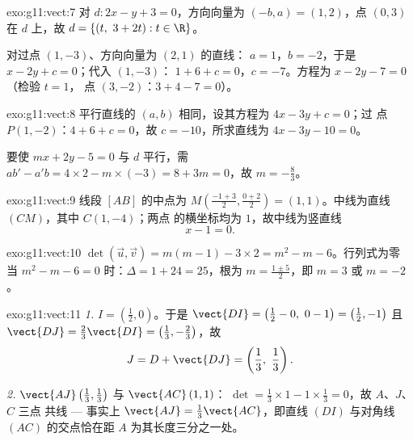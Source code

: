 \begin{solution}{exo:g11:vect:7}
对 $d: 2x - y + 3 = 0$，方向向量为 $(-b, a) = (1, 2)$，点
$(0, 3)$ 在 $d$ 上，故 $d = \{(t,\ 3 + 2t) : t \in \R\}$。

对过点 $(1, -3)$、方向向量为 $(2, 1)$ 的直线：
$a = 1$，$b = -2$，于是 $x - 2y + c = 0$；代入 $(1, -3)$：
$1 + 6 + c = 0$，$c = -7$。方程为 $x - 2y - 7 = 0$（检验 $t = 1$，
点 $(3, -2)$：$3 + 4 - 7 = 0$）。
\end{solution}

\begin{solution}{exo:g11:vect:8}
平行直线的 $(a, b)$ 相同，设其方程为 $4x - 3y + c = 0$；过
点 $P(1, -2)$：$4 + 6 + c = 0$，故 $c = -10$，所求直线为
$4x - 3y - 10 = 0$。

要使 $mx + 2y - 5 = 0$ 与 $d$ 平行，需
$ab' - a'b = 4 \times 2 - m \times (-3) = 8 + 3m = 0$，故
$m = -\frac83$。
\end{solution}

\begin{solution}{exo:g11:vect:9}
线段 $[AB]$ 的中点为 $M\!\left(\frac{-1+3}{2}, \frac{0+2}{2}\right)
= (1, 1)$。中线为直线 $(CM)$，其中 $C(1, -4)$；两点
的横坐标均为 $1$，故中线为竖直线
\[
x - 1 = 0 .
\]
\end{solution}

\begin{solution}{exo:g11:vect:10}
$\det(\vec u, \vec v) = m(m - 1) - 3 \times 2 = m^2 - m - 6$。行列式为零
当 $m^2 - m - 6 = 0$ 时：$\Delta = 1 + 24 = 25$，根为
$m = \frac{1 \pm 5}{2}$，即 $m = 3$ 或 $m = -2$。
\end{solution}

\begin{solution}{exo:g11:vect:11}
\emph{1.} $I = \left(\frac12, 0\right)$。于是
$\vect{DI} = \left(\frac12 - 0,\ 0 - 1\right) = \left(\frac12, -1\right)$
且 $\vect{DJ} = \frac23\vect{DI} = \left(\frac13, -\frac23\right)$，故
\[
J = D + \vect{DJ} = \left(\frac13,\ \frac13\right).
\]

\emph{2.} $\vect{AJ}\left(\frac13, \frac13\right)$ 与
$\vect{AC}\,(1, 1)$：
$\det = \frac13 \times 1 - 1 \times \frac13 = 0$，故 $A$、$J$、$C$ 三点
共线 --- 事实上 $\vect{AJ} = \frac13\vect{AC}$，即直线 $(DI)$
与对角线 $(AC)$ 的交点恰在距 $A$ 为其长度三分之一处。
\end{solution}

